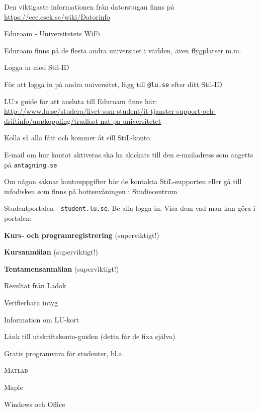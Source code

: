 \documentclass[10pt]{article}
\def\date{2016}
\def\doctitle{Datorstugan \date}
\begin{document}
	\heading{\doctitle}

	\begin{dashlist}
		\item Den viktigaste informationen från datorstugan finns på \url{https://eee.esek.se/wiki/Datorinfo}

		\item Eduroam - Universitetets WiFi
		\begin{dashlist}
			\item Eduroam finns på de flesta andra universitet i världen, även flygplatser m.m.
			\item Logga in med Stil-ID
			\item För att logga in på andra universitet, lägg till \texttt{@lu.se} efter ditt Stil-ID
			\item LU:s guide för att ansluta till Eduroam finns här:\\
			\url{http://www.lu.se/studera/livet-som-student/it-tjanster-support-och-driftinfo/uppkoppling/tradlost-nat-pa-universitetet}
		\end{dashlist}

		\item Kolla så alla fått och kommer åt sill StiL-konto
		\begin{dashlist}
			\item E-mail om hur kontot aktiveras ska ha skickats till den e-mailadress som angetts på \texttt{antagning.se}
			\item Om någon saknar kontouppgifter bör de kontakta StiL-supporten eller gå till infodisken som finns på bottenvåningen i Studiecentrum
		\end{dashlist}

		\item Studentportalen - \texttt{student.lu.se}. Be alla logga in. Visa dem vad man kan göra i portalen:
		\begin{dashlist}
			\item \textbf{Kurs- och programregistrering} (superviktigt!)
			\item \textbf{Kursanmälan} (superviktigt!)
			\item \textbf{Tentamensanmälan} (superviktigt!)
			\item Resultat från Ladok
			\item Verifierbara intyg
			\item Information om LU-kort
			\item Länk till utskriftskonto-guiden (detta får de fixa själva)

			\item Gratis programvara för studenter, bl.a.
			\begin{dashlist}
				\item \textsc{Matlab}
				\item Maple
				\item Windows och Office
			\end{dashlist}
		\end{dashlist}


\end{dashlist}
\end{document}
